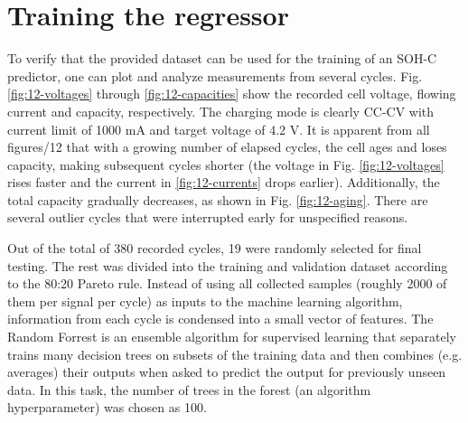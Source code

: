 \section{Training the regressor}

To verify that the provided dataset can be used for the training of an SOH-C predictor, one can plot and analyze measurements from several cycles. Fig. \ref{fig:12-voltages} through \ref{fig:12-capacities} show the recorded cell voltage, flowing current and capacity, respectively. The charging mode is clearly CC-CV with current limit of 1000 mA and target voltage of 4.2 V. It is apparent from all figures/12 that with a growing number of elapsed cycles, the cell ages and loses capacity, making subsequent cycles shorter (the voltage in Fig. \ref{fig:12-voltages} rises faster and the current in \ref{fig:12-currents} drops earlier). 
Additionally, the total capacity gradually decreases, as shown in Fig. \ref{fig:12-aging}. There are several outlier cycles that were interrupted early for unspecified reasons.

Out of the total of 380 recorded cycles, 19 were randomly selected for final testing. The rest was divided into the training and validation dataset according to the 80:20 Pareto rule. Instead of using all collected samples (roughly 2000 of them per signal per cycle) as inputs to the machine learning algorithm, information from each cycle is condensed into a small vector of features. The Random Forrest is an ensemble algorithm for supervised learning that separately trains many decision trees on subsets of the training data and then combines (e.g. averages) their outputs when asked to predict the output for previously unseen data. In this task, the number of trees in the forest (an algorithm hyperparameter) was chosen as 100.

